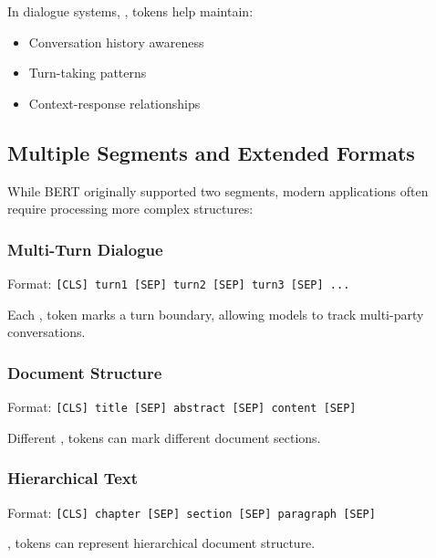 In dialogue systems, \sep{} tokens help maintain:
\begin{itemize}
\item Conversation history awareness
\item Turn-taking patterns
\item Context-response relationships
\end{itemize}

\subsection{Multiple Segments and Extended Formats}

While BERT originally supported two segments, modern applications often require processing more complex structures:

\subsubsection{Multi-Turn Dialogue}
Format: \texttt{[CLS] turn1 [SEP] turn2 [SEP] turn3 [SEP] ...}

Each \sep{} token marks a turn boundary, allowing models to track multi-party conversations.

\subsubsection{Document Structure}
Format: \texttt{[CLS] title [SEP] abstract [SEP] content [SEP]}

Different \sep{} tokens can mark different document sections.

\subsubsection{Hierarchical Text}
Format: \texttt{[CLS] chapter [SEP] section [SEP] paragraph [SEP]}

\sep{} tokens can represent hierarchical document structure.

